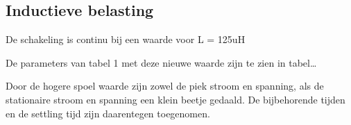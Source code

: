 \subsection{Inductieve belasting}
\label{sub:1.5_ind_bel}
De schakeling is continu bij een waarde voor L = 125uH 

De parameters van tabel 1 met deze nieuwe waarde zijn te zien in tabel…  

Door de hogere spoel waarde zijn zowel de piek stroom en spanning, als de stationaire stroom en spanning een klein beetje gedaald. De bijbehorende tijden en de settling tijd zijn daarentegen toegenomen.  

\begin{table}[h!]
\centering
{}
\caption{Nummerieke analyse buck converter 2}
\end{table}